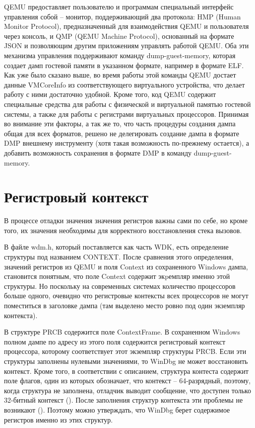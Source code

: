 \documentclass{mipt-thesis-bs}
\begin{document}
QEMU предоставляет пользователю и программам специальный интерфейс управления собой -- монитор, поддерживающий два протокола: HMP (Human Monitor Protocol), предназначенный для взаимодействия QEMU и пользователя через консоль, и QMP (QEMU Machine Protocol), основанный на формате JSON и позволяющим другим приложениям управлять работой QEMU. Оба эти механизма управления поддерживают команду dump-guest-memory, которая создает дамп гостевой памяти в указанном формате, например в формате ELF. Как уже было сказано выше, во время работы этой команды QEMU достает данные VMCoreInfo из соответствующего виртуального устройства, что делает работу с ними достаточно удобной. Кроме того, код QEMU содержит специальные средства для работы с физической и виртуальной памятью гостевой системы, а также для работы с регистрами виртуальных процессоров. Принимая во внимание эти факторы, а так же то, что часть процедуры создания дампа общая для всех форматов, решено не делегировать создание дампа в формате DMP внешнему инструменту (хотя такая возможность по-прежнему остается), а добавить возможность сохранения в формате DMP в команду dump-guest-memory.

\section*{Регистровый контекст}

В процессе отладки значения значения регистров важны сами по себе, но кроме того, их значения необходимы для корректного восстановления стека вызовов.

В файле wdm.h, который поставляется как часть WDK, есть определение структуры под названием CONTEXT. После сравнения этого определения, значений регистров из QEMU и поля Context из сохраненного Windows дампа, становится понятным, что поле Context содержит экpемпляр именно этой структуры. Но поскольку на современных системах количество процессоров больше одного, очевидно что регистровые контексты всех процессоров не могут поместиться в заголовке дампа (там выделено место ровно под один экземпляр контекста).

В структуре PRCB содержится поле ContextFrame. В сохраненном Windows полном дампе по адресу из этого поля содержится регистровый контекст процессора, которому соответствует этот экземпляр структуры PRCB. Если эти структуры заполнены нулевыми значениями, то WinDbg не может восстановить контекст. Кроме того, в соответствии с описанием, структура контеста содержит поле флагов, один из которых обозначает, что контекст -- 64-разрядный, поэтому, когда структура не заполнена, отладчик выводит сообщение, что доступен только 32-битный контекст (). После заполнения структур контекста эти проблемы не возникают (). Поэтому можно утверждать, что WinDbg берет содержимое регистров именно из этих структур.
\end{document}
